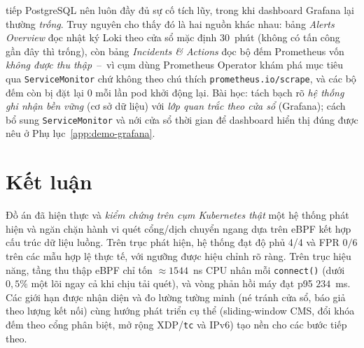 \begin{itemize}[leftmargin=1.4em]
        tiếp PostgreSQL nên luôn đầy đủ sự cố tích lũy, trong khi dashboard Grafana lại
        thường \emph{trống}. Truy nguyên cho thấy đó là hai nguồn khác nhau: bảng
        \emph{Alerts Overview} đọc nhật ký Loki theo cửa sổ mặc định $30$~phút (không có
        tấn công gần đây thì trống), còn bảng \emph{Incidents \& Actions} đọc bộ đếm
        Prometheus vốn \emph{không được thu thập}~--~vì cụm dùng Prometheus Operator khám
        phá mục tiêu qua \texttt{ServiceMonitor} chứ không theo chú thích
        \texttt{prometheus.io/scrape}, và các bộ đếm còn bị đặt lại $0$ mỗi lần pod khởi
        động lại. Bài học: tách bạch rõ \emph{hệ thống ghi nhận bền vững} (cơ sở dữ liệu)
        với \emph{lớp quan trắc theo cửa sổ} (Grafana); cách bổ sung \texttt{ServiceMonitor}
        và nới cửa sổ thời gian để dashboard hiển thị đúng được nêu ở
        Phụ lục~\ref{app:demo-grafana}.
\end{itemize}

\section{Kết luận}

Đồ án đã hiện thực và \emph{kiểm chứng trên cụm Kubernetes thật} một hệ thống
phát hiện và ngăn chặn hành vi quét cổng/dịch chuyển ngang dựa trên eBPF kết hợp
cấu trúc dữ liệu luồng. Trên trục phát hiện, hệ thống đạt độ phủ 4/4 và FPR $0/6$
trên các mẫu hợp lệ thực tế, với ngưỡng được hiệu chỉnh rõ ràng. Trên trục hiệu
năng, tầng thu thập eBPF chỉ tốn $\approx 1544$~ns CPU nhân mỗi \texttt{connect()}
(dưới $0{,}5\%$ một lõi ngay cả khi chịu tải quét), và vòng phản hồi máy đạt p95
$234$~ms. Các giới hạn được nhận diện và đo lường tường minh (né tránh cửa sổ,
báo giả theo lượng kết nối) cùng hướng phát triển cụ thể (sliding-window CMS,
đổi khóa đếm theo cổng phân biệt, mở rộng XDP/\texttt{tc} và IPv6) tạo nền cho các
bước tiếp theo.
